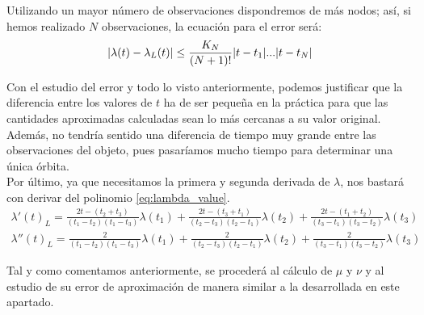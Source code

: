 Utilizando un mayor número de observaciones dispondremos de más nodos; así, si hemos realizado $N$ observaciones, la ecuación para el error será:
\begin{align}
|\lambda(t)-\lambda_L(t)|\leq\frac{\displaystyle K_N}{\displaystyle (N+1)!}|t-t_1|...|t-t_N|
\label{eq:interpolation_error_n_observations}
\end{align}

Con el estudio del error y todo lo visto anteriormente, podemos justificar que la diferencia entre los valores de $t$ ha de ser pequeña en la práctica para que las cantidades aproximadas calculadas sean lo más cercanas a su valor original. Además, no tendría sentido una diferencia de tiempo muy grande entre las observaciones del objeto, pues pasaríamos mucho tiempo para determinar una única órbita.\\

Por último, ya que necesitamos la primera y segunda derivada de $\lambda$, nos bastará con derivar del polinomio \eqref{eq:lambda_value}.
\begin{align*}
\lambda'(t)_L = \frac{2t-(t_2+t_3)}{(t_1-t_2)(t_1-t_3)}\lambda(t_1)
+\frac{2t-(t_3+t_1)}{(t_2-t_3)(t_2-t_1)}\lambda(t_2)
+\frac{2t-(t_1+t_2)}{(t_3-t_1)(t_3-t_2)}\lambda(t_3)\\
\lambda''(t)_L = \frac{2}{(t_1-t_2)(t_1-t_3)}\lambda(t_1)
+\frac{2}{(t_2-t_3)(t_2-t_1)}\lambda(t_2)
+\frac{2}{(t_3-t_1)(t_3-t_2)}\lambda(t_3)
\end{align*}

Tal y como comentamos anteriormente, se procederá al cálculo de $\mu$ y $\nu$ y al estudio de su error de aproximación de manera similar a la desarrollada en este apartado.\\

\newpage
\thispagestyle{empty}


